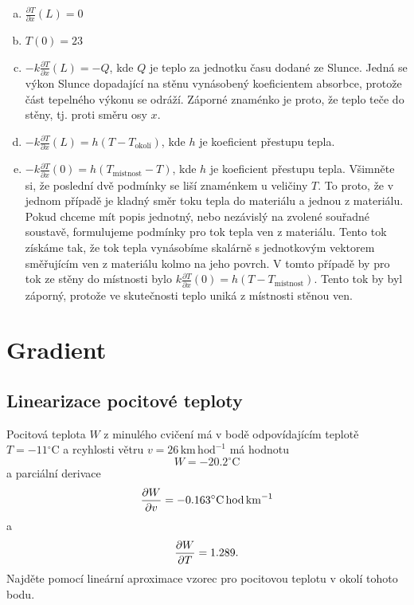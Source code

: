 \begin{enumerate}[a)]
\item $\frac{\partial T}{\partial x}(L)=0$
\item $T(0)=23$
\item $-k\frac{\partial T}{\partial x}(L)=-Q$, kde $Q$ je teplo za jednotku času dodané ze Slunce. Jedná se výkon Slunce dopadající na stěnu vynásobený koeficientem absorbce, protože část tepelného výkonu se odráží. Záporné znaménko je proto, že teplo teče do stěny, tj. proti směru osy $x$.
\item $-k\frac{\partial T}{\partial x}(L)=h(T-T_{\text{okolí}})$, kde $h$ je koeficient přestupu tepla.
\item $-k\frac{\partial T}{\partial x}(0)=h(T_{\text{místnost}}-T)$, kde $h$ je koeficient přestupu tepla.
  Všimněte si, že poslední dvě podmínky se liší znaménkem u veličiny $T$. To proto, že v jednom případě je kladný směr toku tepla do materiálu a jednou z materiálu. Pokud chceme mít popis jednotný, nebo nezávislý na zvolené souřadné soustavě, formulujeme podmínky pro tok tepla ven z materiálu. Tento tok získáme tak, že tok tepla vynásobíme skalárně s jednotkovým vektorem směřujícím ven z materiálu kolmo na jeho povrch. V tomto případě by pro tok ze stěny do místnosti bylo $k\frac{\partial T}{\partial x}(0)=h(T-T_{\text{místnost}})$. Tento tok by byl záporný, protože ve skutečnosti teplo uniká z místnosti stěnou ven.
\end{enumerate}
\konec


\section{Gradient}


\subsection{Linearizace pocitové teploty}

Pocitová teplota $W$ z minulého cvičení má v bodě odpovídajícím teplotě $T=-11{}^\circ\mathrm C$ a rcyhlosti větru $v=26\,\mathrm {km}\,\mathrm{hod}^{-1}$ má hodnotu $$W=-20.2 ^\circ\mathrm C$$ a parciální derivace $$\pdv{W}{v}=-0.163 ^\circ\mathrm C\, \mathrm {hod}\,\mathrm{km}^{-1}$$ a
$$\pdv{W}{T}=1.289.$$ Najděte pomocí lineární aproximace vzorec pro pocitovou teplotu v okolí tohoto bodu.

